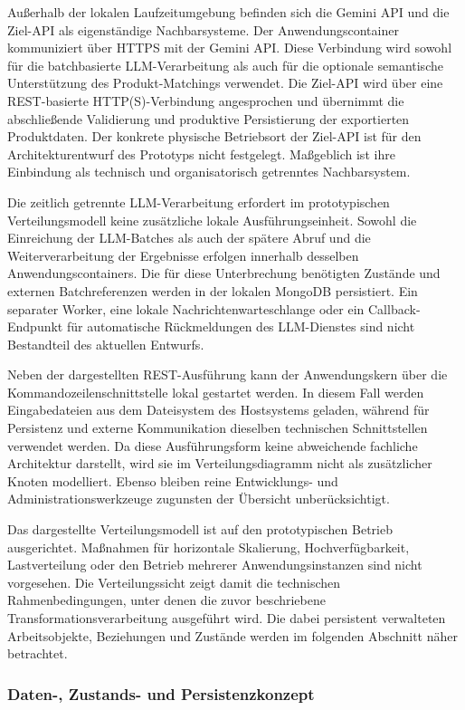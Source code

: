 Außerhalb der lokalen Laufzeitumgebung befinden sich die Gemini API und die Ziel-API als eigenständige Nachbarsysteme. Der Anwendungscontainer kommuniziert über HTTPS mit 
der Gemini API. Diese Verbindung wird sowohl für die batchbasierte LLM-Verarbeitung als auch für die optionale semantische Unterstützung des Produkt-Matchings verwendet. 
Die Ziel-API wird über eine REST-basierte HTTP(S)-Verbindung angesprochen und übernimmt die abschließende Validierung und produktive Persistierung der exportierten 
Produktdaten. Der konkrete physische Betriebsort der Ziel-API ist für den Architekturentwurf des Prototyps nicht festgelegt. Maßgeblich ist ihre Einbindung als technisch 
und organisatorisch getrenntes Nachbarsystem.

Die zeitlich getrennte LLM-Verarbeitung erfordert im prototypischen Verteilungsmodell keine zusätzliche lokale Ausführungseinheit. Sowohl die Einreichung der LLM-Batches 
als auch der spätere Abruf und die Weiterverarbeitung der Ergebnisse erfolgen innerhalb desselben Anwendungscontainers. Die für diese Unterbrechung benötigten Zustände und 
externen Batchreferenzen werden in der lokalen MongoDB persistiert. Ein separater Worker, eine lokale Nachrichtenwarteschlange oder ein Callback-Endpunkt für automatische 
Rückmeldungen des LLM-Dienstes sind nicht Bestandteil des aktuellen Entwurfs.

Neben der dargestellten REST-Ausführung kann der Anwendungskern über die Kommandozeilenschnittstelle lokal gestartet werden. In diesem Fall werden Eingabedateien aus dem 
Dateisystem des Hostsystems geladen, während für Persistenz und externe Kommunikation dieselben technischen Schnittstellen verwendet werden. Da diese Ausführungsform keine 
abweichende fachliche Architektur darstellt, wird sie im Verteilungsdiagramm nicht als zusätzlicher Knoten modelliert. Ebenso bleiben reine Entwicklungs- und 
Administrationswerkzeuge zugunsten der Übersicht unberücksichtigt.

Das dargestellte Verteilungsmodell ist auf den prototypischen Betrieb ausgerichtet. Maßnahmen für horizontale Skalierung, Hochverfügbarkeit, Lastverteilung oder den Betrieb 
mehrerer Anwendungsinstanzen sind nicht vorgesehen. Die Verteilungssicht zeigt damit die technischen Rahmenbedingungen, unter denen die zuvor beschriebene 
Transformationsverarbeitung ausgeführt wird. Die dabei persistent verwalteten Arbeitsobjekte, Beziehungen und Zustände werden im folgenden Abschnitt näher betrachtet.

\subsubsection{Daten-, Zustands- und Persistenzkonzept}

